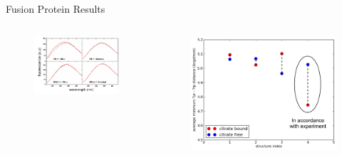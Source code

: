 \documentclass{beamer}
\begin{document}
\begin{frame}[t]
\begin{columns}[T,onlytextwidth]
\begin{column}{.48\linewidth}
{\begin{block}{Fusion Protein Results}
            \begin{columns}[t]
                \begin{figure}
                    \includegraphics[width=1.0\textwidth]{figures/TyrTrp/TyrTrp_experiment.pdf}
                \end{figure}         

                \begin{figure}
                    \includegraphics[width=1.0\textwidth]{figures/TyrTrp/average_mindist_TyrTrp_annotated.pdf}
                \end{figure}      

            \end{columns}     


\end{block}}
\end{column}
\end{columns}
\end{frame}
\end{document}
